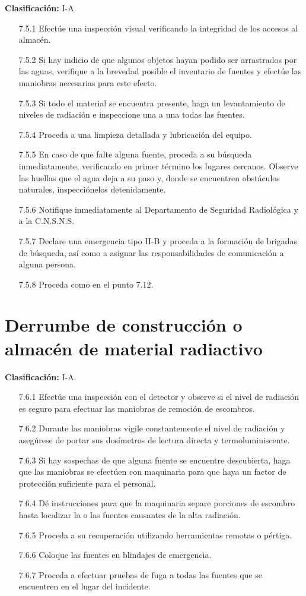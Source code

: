 \textbf{Clasificación:} I-A.
\begin{enumerate}
  \item[7.5.1] Efectúe una inspección visual verificando la integridad de los accesos al almacén.
  \item[7.5.2] Si hay indicio de que algunos objetos hayan podido ser arrastrados por las aguas, verifique a la brevedad posible el inventario de fuentes y efectúe las maniobras necesarias para este efecto.
  \item[7.5.3] Si todo el material se encuentra presente, haga un levantamiento de niveles de radiación e inspeccione una a una todas las fuentes.
  \item[7.5.4] Proceda a una limpieza detallada y lubricación del equipo.
  \item[7.5.5] En caso de que falte alguna fuente, proceda a su búsqueda inmediatamente, verificando en primer término los lugares cercanos. Observe las huellas que el agua deja a su paso y, donde se encuentren obstáculos naturales, inspecciónelos detenidamente.
  \item[7.5.6] Notifique inmediatamente al Departamento de Seguridad Radiológica y a la C.N.S.N.S.
  \item[7.5.7] Declare una emergencia tipo II-B y proceda a la formación de brigadas de búsqueda, así como a asignar las responsabilidades de comunicación a alguna persona.
  \item[7.5.8] Proceda como en el punto 7.12.
\end{enumerate}

\section{Derrumbe de construcción o almacén de material radiactivo}

\textbf{Clasificación:} I-A.
\begin{enumerate}
  \item[7.6.1] Efectúe una inspección con el detector y observe si el nivel de radiación es seguro para efectuar las maniobras de remoción de escombros.
  \item[7.6.2] Durante las maniobras vigile constantemente el nivel de radiación y asegúrese de portar sus dosímetros de lectura directa y termoluminiscente.
  \item[7.6.3] Si hay sospechas de que alguna fuente se encuentre descubierta, haga que las maniobras se efectúen con maquinaria para que haya un factor de protección suficiente para el personal.
  \item[7.6.4] Dé instrucciones para que la maquinaria separe porciones de escombro hasta localizar la o las fuentes causantes de la alta radiación.
  \item[7.6.5] Proceda a su recuperación utilizando herramientas remotas o pértiga.
  \item[7.6.6] Coloque las fuentes en blindajes de emergencia.
  \item[7.6.7] Proceda a efectuar pruebas de fuga a todas las fuentes que se encuentren en el lugar del incidente.
\end{enumerate}

